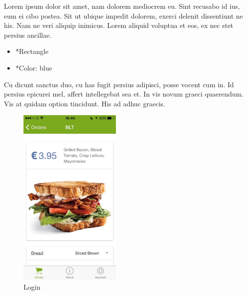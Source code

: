 \begin{minipage}{0.55\textwidth}
	Lorem ipsum dolor sit amet, nam dolorem mediocrem eu. Sint recusabo id ius, eum ei cibo postea. Sit ut ubique impedit dolorem, exerci delenit dissentiunt ne his. Nam ne veri aliquip inimicus. Lorem aliquid voluptua et eos, ex nec stet persius ancillae.
	\begin{itemize}
		\item *Rectangle
		\item *Color: blue
	\end{itemize}
	Cu dicunt sanctus duo, cu has fugit persius adipisci, posse vocent cum in. Id persius epicurei mel, affert intellegebat sea et. In vis novum graeci quaerendum. Vis at quidam option tincidunt. His ad adhuc graecis.
\end{minipage}
\begin{minipage}{5cm}
	\begin{figure}[H]
		\includegraphics[width=5cm]{img/mobile-app/screen-shots/IMG_2908.jpg}
		\caption{Login}
	\end{figure}
\end{minipage} \hfill

